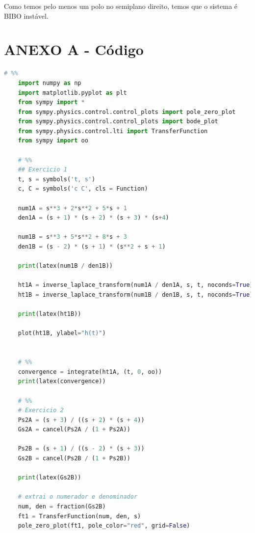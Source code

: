 \documentclass[12pt]{scrartcl}
\begin{document}
Como temos pelo menos um polo no semiplano direito, temos que o sistema é BIBO instável.

\newpage

\section*{ANEXO A - Código}

\begin{lstlisting}[language=Python, breaklines=true, basicstyle=\scriptsize]
    # %%
    import numpy as np
    import matplotlib.pyplot as plt
    from sympy import *
    from sympy.physics.control.control_plots import pole_zero_plot
    from sympy.physics.control.control_plots import bode_plot
    from sympy.physics.control.lti import TransferFunction
    from sympy import oo

    # %%
    ## Exercicio 1
    t, s = symbols('t, s')
    c, C = symbols('c C', cls = Function)

    num1A = s**3 + 2*s**2 + 5*s + 1
    den1A = (s + 1) * (s + 2) * (s + 3) * (s+4)

    num1B = s**3 + 5*s**2 + 8*s + 3
    den1B = (s - 2) * (s + 1) * (s**2 + s + 1)

    print(latex(num1B / den1B))

    ht1A = inverse_laplace_transform(num1A / den1A, s, t, noconds=True)
    ht1B = inverse_laplace_transform(num1B / den1B, s, t, noconds=True)

    print(latex(ht1B))

    plot(ht1B, ylabel="h(t)")


    # %%
    convergence = integrate(ht1A, (t, 0, oo))
    print(latex(convergence))

    # %%
    # Exercicio 2
    Ps2A = (s + 3) / ((s + 2) * (s + 4))
    Gs2A = cancel(Ps2A / (1 + Ps2A))

    Ps2B = (s + 1) / ((s - 2) * (s + 3))
    Gs2B = cancel(Ps2B / (1 + Ps2B))

    print(latex(Gs2B))

    # extrai o numerador e denominador
    num, den = fraction(Gs2B)
    ft1 = TransferFunction(num, den, s)
    pole_zero_plot(ft1, pole_color="red", grid=False)
\end{lstlisting}
\end{document}
